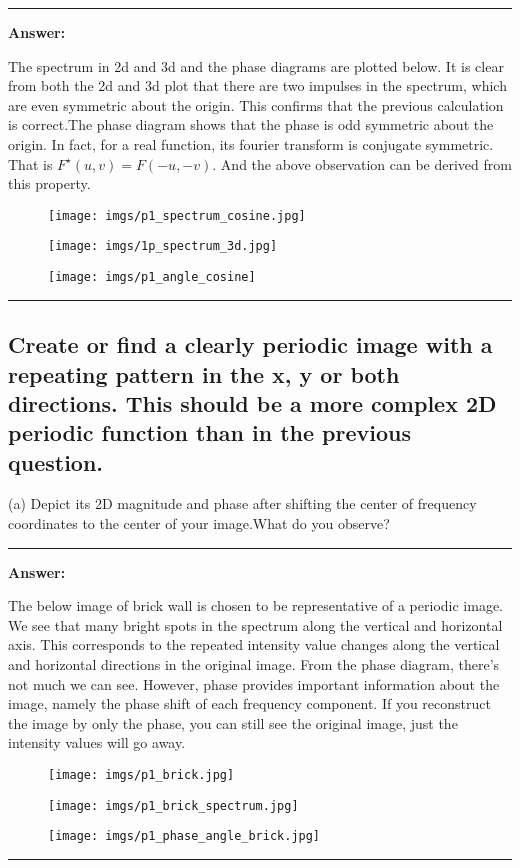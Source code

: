 \documentclass[conference]{styles/acmsiggraph}
\newenvironment{answer}{}{}
\begin{document}
\begin{answer}
	\rule{\textwidth}{0.4pt}
	
	\textbf{Answer:}

	The spectrum in 2d and 3d and the phase diagrams are plotted below. It is clear from both the 2d and 3d plot that there are two impulses in the spectrum, which are even symmetric about the origin. This confirms that the previous calculation is correct.The phase diagram shows that the phase is odd symmetric about the origin. In fact, for a real function, its fourier transform is conjugate symmetric. That is $F^{\star}(u,v) = F(-u,-v)$. And the above observation can be derived from this property.
	\begin{figure}[H]
	\centering
	\texttt{[image: imgs/p1\_spectrum\_cosine.jpg]}
	\end{figure}	
	\begin{figure}[H]
		\centering
		\texttt{[image: imgs/1p\_spectrum\_3d.jpg]}
		\end{figure}	
	\begin{figure}[H]
		\centering
		\texttt{[image: imgs/p1\_angle\_cosine]}
		\end{figure}	

\rule{\textwidth}{0.4pt}
\end{answer}
\subsection{Create or find a clearly periodic image with a repeating pattern in the x, y or both directions. This
should be a more complex 2D periodic function than in the previous question.}
(a) Depict its 2D magnitude and phase after shifting the center of frequency coordinates to the
center of your image.What do you observe?

\begin{answer}
	\rule{\textwidth}{0.4pt}
	\textbf{Answer:}

	The below image of brick wall is chosen to be representative of a periodic image. We see that many bright spots in the spectrum along the vertical and horizontal axis. This corresponds to the repeated intensity value changes along the vertical and horizontal directions in the original image. From the phase diagram, there's not much we can see. However, phase provides important information about the image, namely the phase shift of each frequency component. If you reconstruct the image by only the phase, you can still see the original image, just the intensity values will go away.
	\begin{figure}[H]
	\centering
	\texttt{[image: imgs/p1\_brick.jpg]}
	\end{figure}	
	\begin{figure}[H]
	\centering
	\texttt{[image: imgs/p1\_brick\_spectrum.jpg]}
	\end{figure}	
	\begin{figure}[H]
	\centering
	\texttt{[image: imgs/p1\_phase\_angle\_brick.jpg]}
	\end{figure}	
	\rule{\textwidth}{0.4pt}
\end{answer}
\end{document}
